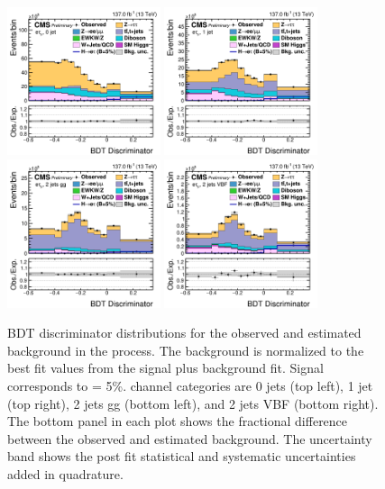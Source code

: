 \begin{figure}[htbp!]
  \centering
  \includegraphics[width=0.4\textwidth]{plots/chapter9/BDT/emu/0jet.png}
  \includegraphics[width=0.4\textwidth]{plots/chapter9/BDT/emu/1jet.png} \\
  \includegraphics[width=0.4\textwidth]{plots/chapter9/BDT/emu/2jet_gg.png}
  \includegraphics[width=0.4\textwidth]{plots/chapter9/BDT/emu/2jet_vbf.png} \\
  \caption{BDT discriminator distributions for the observed and estimated background in the \Hemu process. The background is normalized to the best fit values from the signal plus background fit. Signal corresponds to \BHet = 5\%. \Hemu channel categories are 0 jets (top left), 1 jet (top right), 2 jets gg (bottom left), and 2 jets VBF (bottom right). The bottom panel in each plot shows the fractional difference between the observed and estimated background. The uncertainty band shows the post fit statistical and systematic uncertainties added in quadrature.}
  \label{fig:bdt_emu}
\end{figure}

